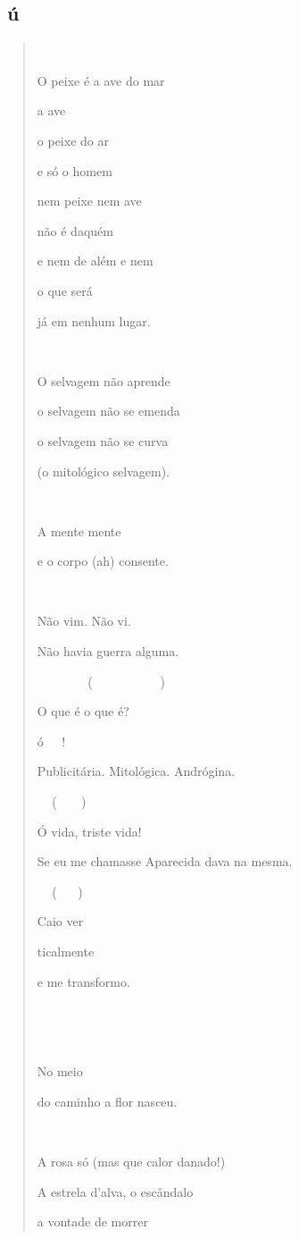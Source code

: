 \subsection{ú}\label{section-5}

\begin{quote}


O peixe é a ave do mar

a ave

o peixe do ar

e só o homem

nem peixe nem ave

não é daquém

e nem de além e nem

o que será

já em nenhum lugar.

 

O selvagem não aprende

o selvagem não se emenda

o selvagem não se curva

(o mitológico selvagem).



A mente mente

e o corpo (ah) consente.

 

Não vim. Não vi.

Não havia guerra alguma.

  (  )

O que é o que é?

ó !

Publicitária. Mitológica. Andrógina.

 ()

Ó vida, triste vida!

Se eu me chamasse Aparecida dava na mesma.

 ()

Caio ver

ticalmente

e me transformo.





No meio

do caminho a flor nasceu.



A rosa só (mas que calor danado!)

A estrela d'alva, o escândalo

a vontade de morrer


\end{quote}
